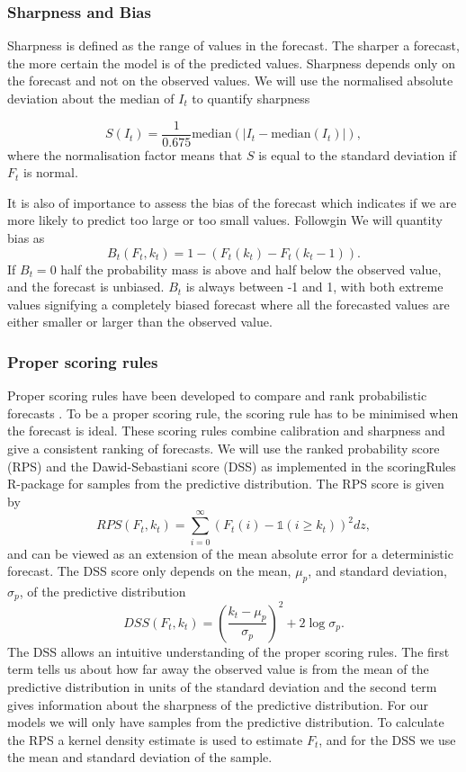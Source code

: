 \documentclass[12pt]{article}
\begin{document}
\subsubsection{Sharpness and Bias}
Sharpness is defined as the range of values in the forecast. The sharper a forecast, the more certain the model is of the predicted values. Sharpness depends only on the forecast and not on the observed values. We will use the normalised absolute deviation about the median of $I_t$ to quantify sharpness

\[ S(I_t) = \frac{1}{0.675} \text{median}(|I_t - \text{median}(I_t)|),\]
where the normalisation factor means that $S$ is equal to the standard deviation if $F_t$ is normal.

It is also of importance to assess the bias of the forecast which indicates if we are more likely to predict too large or too small values. Followgin \cite{funkAssessingPerformanceRealtime2019} We will quantity bias as
\[B_t(F_t, k_t) = 1 - (F_t(k_t) - F_t(k_t - 1)).\]
If $B_t=0$ half the probability mass is above and half below the observed value, and the forecast is unbiased. $B_t$ is always between -1 and 1, with both extreme values signifying a completely biased forecast where all the forecasted values are either smaller or larger than the observed value.

\subsubsection{Proper scoring rules}
Proper scoring rules have been developed to compare and rank probabilistic forecasts \cite{gneitingStrictlyProperScoring2007}. To be a proper scoring rule, the scoring rule has to be minimised when the forecast is ideal. These scoring rules combine calibration and sharpness and give a consistent ranking of forecasts. We will use the ranked probability score (RPS) and the Dawid-Sebastiani score (DSS) as implemented in the scoringRules R-package \cite{jordanEvaluatingProbabilisticForecasts2018} for samples from the predictive distribution. The RPS score is given by 
\[RPS(F_t,k_t) = \sum_{i=0}^\infty(F_t(i) - \mathds{1}(i \geq k_t))^2 dz, \]
and can be viewed as an extension of the mean absolute error for a deterministic forecast. The DSS score only depends on the mean, $\mu_p$, and standard deviation, $\sigma_p$, of the predictive distribution
\[DSS(F_t, k_t) = \left(\frac{k_t- \mu_p}{\sigma_p}\right)^2 + 2\log\sigma_p.\]
The DSS allows an intuitive understanding of the proper scoring rules. The first term tells us about how far away the observed value is from the mean of the predictive distribution in units of the standard deviation and the second term gives information about the sharpness of the predictive distribution. For our models we will only have samples from the predictive distribution. To calculate the RPS a kernel density estimate is used to estimate $F_t$, and for the DSS we use the mean and standard deviation of the sample. 
\end{document}
